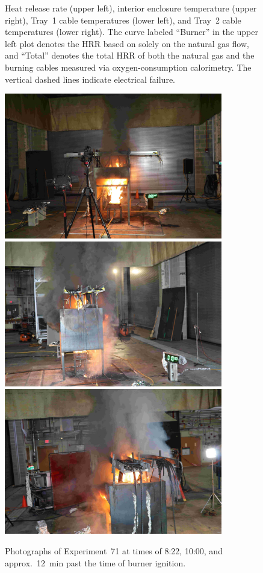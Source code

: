 \begin{figure}[H]
\caption[HRR and temperatures of Experiment 71]{Heat release rate (upper left), interior enclosure temperature (upper right), Tray~1 cable temperatures (lower left), and Tray~2 cable temperatures (lower right). The curve labeled ``Burner'' in the upper left plot denotes the HRR based on solely on the natural gas flow, and ``Total'' denotes the total HRR of both the natural gas and the burning cables measured via oxygen-consumption calorimetry. The vertical dashed lines indicate electrical failure.}
\label{fig:Test_71}
\end{figure}

\begin{figure}[p]
\centering
\includegraphics[height=2.50in]{../FIGURES/Test_71_Photo_1} \\ \vspace{0.1in}
\includegraphics[height=2.50in]{../FIGURES/Test_71_Photo_2} \\ \vspace{0.1in}
\includegraphics[height=2.50in]{../FIGURES/Test_71_Photo_3}
\caption[Photographs of Experiment~71]{Photographs of Experiment~71 at times of 8:22, 10:00, and approx.~12~min past the time of burner ignition.}
\label{fig:Test_71_photos}
\end{figure}



